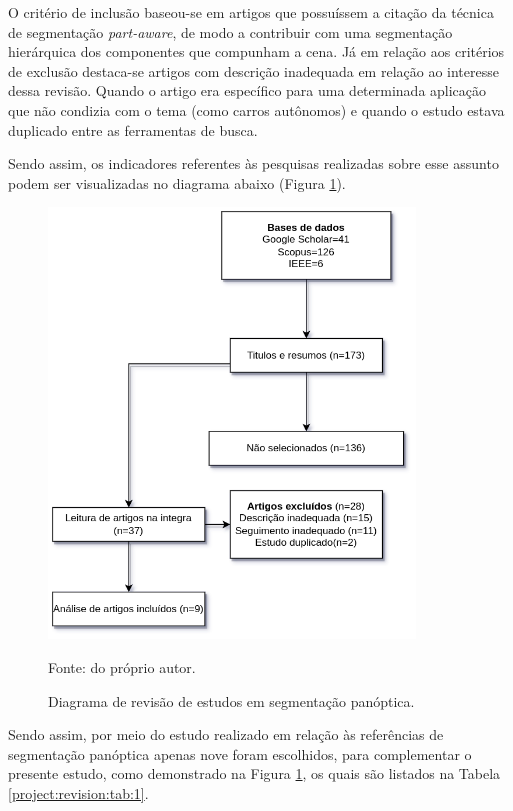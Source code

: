 O critério de inclusão baseou-se em artigos que possuíssem a citação da técnica de segmentação \textit{part-aware}, de modo a contribuir com uma segmentação hierárquica dos componentes que compunham a cena. Já em relação aos critérios de exclusão destaca-se artigos com descrição inadequada em relação ao interesse dessa revisão. Quando o artigo era específico para uma determinada aplicação que não condizia com o tema (como carros autônomos) e quando o estudo estava duplicado entre as ferramentas de busca.

Sendo assim, os indicadores referentes às pesquisas realizadas sobre esse assunto podem ser visualizadas no diagrama abaixo (Figura \ref{project:revision:fig:1}).

\begin{figure}[H]
    \centering
    \caption{Diagrama de revisão de estudos em segmentação panóptica.}
    \includegraphics[height=4.5in]{recursos/imagens/project/revisao_panoptica.png}
    \label{project:revision:fig:1}

    Fonte: do próprio autor.
\end{figure}

Sendo assim, por meio do estudo realizado em relação às referências de segmentação panóptica apenas nove foram escolhidos, para complementar o presente estudo, como demonstrado na Figura \ref{project:revision:fig:1}, os quais são listados na Tabela \ref{project:revision:tab:1}.

